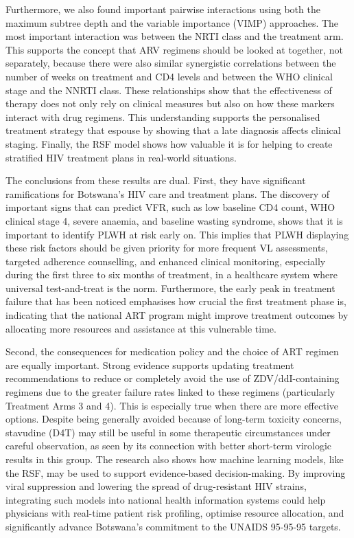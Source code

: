 \documentclass[10pt]{NSP1}
\begin{document}
Furthermore, we also found important pairwise interactions using both the maximum subtree depth and the variable importance (VIMP) approaches. The most important interaction was between the NRTI class and the treatment arm. This supports the concept that ARV regimens should be looked at together, not separately, because there were also similar synergistic correlations between the number of weeks on treatment and CD4 levels and between the WHO clinical stage and the NNRTI class. These relationships show that the effectiveness of therapy does not only rely on clinical measures but also on how these markers interact with drug regimens. This understanding supports the personalised treatment strategy that \cite{Shaik2025} espouse by showing that a late diagnosis affects clinical staging. Finally, the RSF model shows how valuable it is for helping to create stratified HIV treatment plans in real-world situations.

The conclusions from these results are dual. First, they have significant ramifications for Botswana's HIV care and treatment plans. The discovery of important signs that can predict VFR, such as low baseline CD4 count, WHO clinical stage 4, severe anaemia, and baseline wasting syndrome, shows that it is important to identify PLWH at risk early on. This implies that PLWH displaying these risk factors should be given priority for more frequent VL assessments, targeted adherence counselling, and enhanced clinical monitoring, especially during the first three to six months of treatment, in a healthcare system where universal test-and-treat is the norm. Furthermore, the early peak in treatment failure that has been noticed emphasises how crucial the first treatment phase is, indicating that the national ART program might improve treatment outcomes by allocating more resources and assistance at this vulnerable time.

Second, the consequences for medication policy and the choice of ART regimen are equally important. Strong evidence supports updating treatment recommendations to reduce or completely avoid the use of ZDV/ddI-containing regimens due to the greater failure rates linked to these regimens (particularly Treatment Arms 3 and 4). This is especially true when there are more effective options. Despite being generally avoided because of long-term toxicity concerns, stavudine (D4T) may still be useful in some therapeutic circumstances under careful observation, as seen by its connection with better short-term virologic results in this group. The research also shows how machine learning models, like the RSF, may be used to support evidence-based decision-making. By improving viral suppression and lowering the spread of drug-resistant HIV strains, integrating such models into national health information systems could help physicians with real-time patient risk profiling, optimise resource allocation, and significantly advance Botswana's commitment to the UNAIDS 95-95-95 targets.
\end{document}
